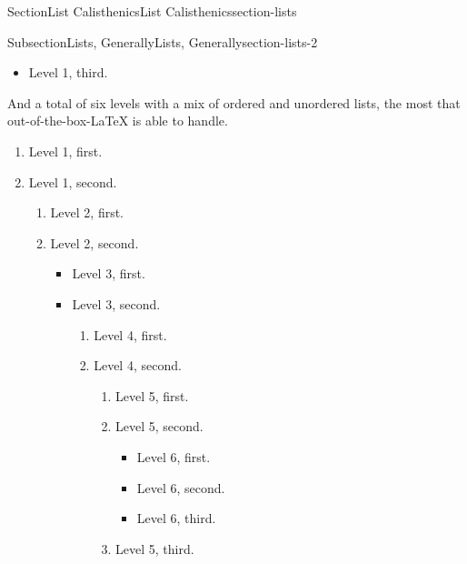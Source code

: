 \documentclass[twoside,10pt,]{article}
\newcommand{\lititle}[1]{{\slshape#1}}
\numberwithin{equation}{section}
\begin{document}
\begin{sectionptx}{Section}{List Calisthenics}{}{List Calisthenics}{}{}{section-lists}
\begin{subsectionptx}{Subsection}{Lists, Generally}{}{Lists, Generally}{}{}{section-lists-2}
\begin{itemize}[label=\textbullet]
\begin{itemize}[label=$\circ$]
\item{}Level 2, first.%
\item{}Level 2, second.%
\begin{itemize}[label=$\blacksquare$]
\item{}Level 3, first.%
\item{}Level 3, second.%
\begin{itemize}[label=\textbullet]
\item{}Level 4, first.%
\item{}Level 4, second.%
\item{}Level 4, third.%
\end{itemize}
%
\item{}\lititle{A title on a nested item.}\par%
Level 2, third.%
\end{itemize}
%
\item{}Level 2, third.%
\end{itemize}
%
\item{}Level 1, third.%
\end{itemize}
%
\par
And a total of six levels with a mix of ordered and unordered lists, the most that out-of-the-box-\LaTeX{} is able to handle.%
\begin{enumerate}
\item{}Level 1, first.%
\item{}Level 1, second.%
\begin{enumerate}
\item{}Level 2, first.%
\item{}Level 2, second.%
\begin{itemize}[label=\textbullet]
\item{}Level 3, first.%
\item{}Level 3, second.%
\begin{enumerate}
\item{}Level 4, first.%
\item{}Level 4, second.%
\begin{enumerate}
\item{}Level 5, first.%
\item{}Level 5, second.%
\begin{itemize}[label=$\circ$]
\item{}Level 6, first.%
\item{}Level 6, second.%
\item{}Level 6, third.%
\end{itemize}
%
\item{}Level 5, third.%

\end{enumerate}
\end{enumerate}
\end{itemize}
\end{enumerate}
\end{enumerate}
\end{subsectionptx}
\end{sectionptx}
\end{document}
